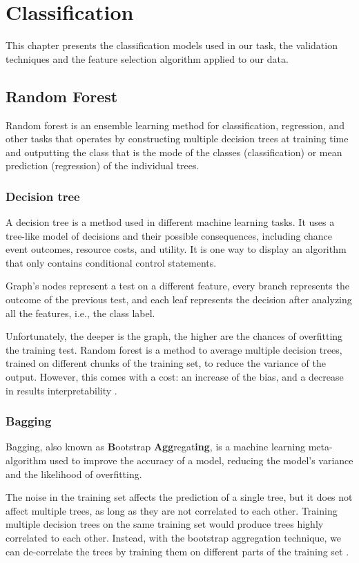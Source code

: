 \chapter{Classification}
\label{ch:classif}
This chapter presents the classification models used in our task, the validation techniques and the feature selection algorithm applied to our data.
\section{Random Forest}
Random forest \cite{ho1995random} is an ensemble learning method for classification, regression, and other tasks that operates by constructing multiple decision trees at training time and outputting the class that is the mode of the classes (classification) or mean prediction (regression) of the individual trees. 
\subsection{Decision tree}
A decision tree \cite{kaminski2018framework} is a method used in different machine learning tasks. It uses a tree-like model of decisions and their possible consequences, including chance event outcomes, resource costs, and utility. It is one way to display an algorithm that only contains conditional control statements. 

Graph's nodes represent a test on a different feature, every branch represents the outcome of the previous test, and each leaf represents the decision after analyzing all the features, i.e., the class label. 

Unfortunately, the deeper is the graph, the higher are the chances of overfitting the training test.
Random forest is a method to average multiple decision trees, trained on different chunks of the training set, to reduce the variance of the output. However, this comes with a cost: an increase of the bias, and a decrease in results interpretability \cite{hastie2009elements}.
\subsection{Bagging}

Bagging, also known as \textbf{B}ootstrap \textbf{Agg}regat\textbf{ing}, is a machine learning meta-algorithm used to improve the accuracy of a model, reducing the model's variance and the likelihood of overfitting. 

The noise in the training set affects the prediction of a single tree, but it does not affect multiple trees, as long as they are not correlated to each other. Training multiple decision trees on the same training set would produce trees highly correlated to each other. Instead, with the bootstrap aggregation technique, we can de-correlate the trees by training them on different parts of the training set \cite{breiman1996bagging}.

